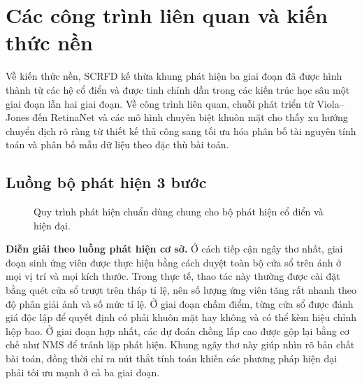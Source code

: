 \section{Các công trình liên quan và kiến thức nền}

Về kiến thức nền, SCRFD kế thừa khung phát hiện ba giai đoạn đã được hình thành từ các hệ cổ điển
và được tinh chỉnh dần trong các kiến trúc học sâu một giai đoạn lẫn hai giai đoạn.
Về công trình liên quan, chuỗi phát triển từ Viola--Jones đến RetinaNet và các mô hình chuyên biệt khuôn mặt
cho thấy xu hướng chuyển dịch rõ ràng từ thiết kế thủ công sang tối ưu hóa phân bố tài nguyên tính toán và phân bố mẫu dữ liệu theo đặc thù bài toán.

\subsection{Luồng bộ phát hiện 3 bước}

\begin{figure}[ht]
\centering
{}
\caption{Quy trình phát hiện chuẩn dùng chung cho bộ phát hiện cổ điển và hiện đại.}
\label{fig:canonical-detection-pipeline}
\end{figure}

\noindent\textbf{Diễn giải theo luồng phát hiện cơ sở.}
Ở cách tiếp cận ngây thơ nhất, giai đoạn sinh ứng viên được thực hiện bằng cách duyệt toàn bộ cửa sổ trên ảnh ở mọi vị trí và mọi kích thước.
Trong thực tế, thao tác này thường được cài đặt bằng quét cửa sổ trượt trên tháp tỉ lệ, nên số lượng ứng viên tăng rất nhanh theo độ phân giải ảnh và số mức tỉ lệ.
Ở giai đoạn chấm điểm, từng cửa sổ được đánh giá độc lập để quyết định có phải khuôn mặt hay không và có thể kèm hiệu chỉnh hộp bao.
Ở giai đoạn hợp nhất, các dự đoán chồng lấp cao được gộp lại bằng cơ chế như NMS để tránh lặp phát hiện.
Khung ngây thơ này giúp nhìn rõ bản chất bài toán, đồng thời chỉ ra nút thắt tính toán khiến các phương pháp hiện đại phải tối ưu mạnh ở cả ba giai đoạn.

